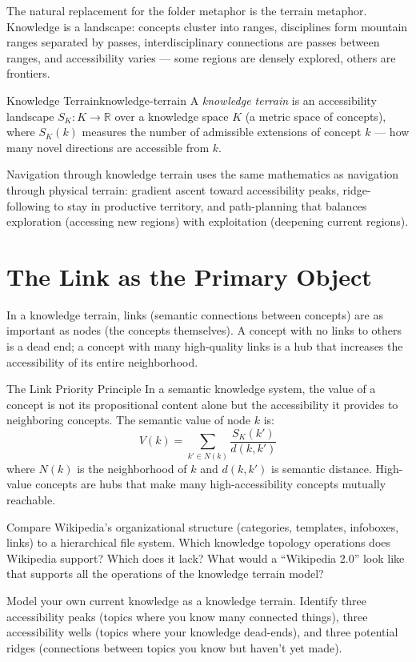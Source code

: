 The natural replacement for the folder metaphor is the terrain metaphor.
Knowledge is a landscape: concepts cluster into ranges, disciplines form
mountain ranges separated by passes, interdisciplinary connections are
passes between ranges, and accessibility varies — some regions are
densely explored, others are frontiers.

\begin{definition}{Knowledge Terrain}{knowledge-terrain}
  A \emph{knowledge terrain} is an accessibility landscape $S_K : K \to
  \mathbb{R}$ over a knowledge space $K$ (a metric space of concepts),
  where $S_K(k)$ measures the number of admissible extensions of concept
  $k$ — how many novel directions are accessible from $k$.
\end{definition}

Navigation through knowledge terrain uses the same mathematics as
navigation through physical terrain: gradient ascent toward accessibility
peaks, ridge-following to stay in productive territory, and path-planning
that balances exploration (accessing new regions) with exploitation
(deepening current regions).

\section{The Link as the Primary Object}

In a knowledge terrain, links (semantic connections between concepts)
are as important as nodes (the concepts themselves). A concept with no
links to others is a dead end; a concept with many high-quality links
is a hub that increases the accessibility of its entire neighborhood.

\begin{namedthm}{The Link Priority Principle}
  In a semantic knowledge system, the value of a concept is not its
  propositional content alone but the accessibility it provides to
  neighboring concepts. The semantic value of node $k$ is:
  \[
    V(k) = \sum_{k' \in N(k)} \frac{S_K(k')}{d(k, k')}
  \]
  where $N(k)$ is the neighborhood of $k$ and $d(k,k')$ is semantic
  distance. High-value concepts are hubs that make many high-accessibility
  concepts mutually reachable.
\end{namedthm}

\begin{exercise}
  Compare Wikipedia's organizational structure (categories, templates,
  infoboxes, links) to a hierarchical file system. Which knowledge
  topology operations does Wikipedia support? Which does it lack?
  What would a ``Wikipedia 2.0'' look like that supports all the
  operations of the knowledge terrain model?
\end{exercise}

\begin{exercise}
  Model your own current knowledge as a knowledge terrain.
  Identify three accessibility peaks (topics where you know many
  connected things), three accessibility wells (topics where
  your knowledge dead-ends), and three potential ridges
  (connections between topics you know but haven't yet made).
\end{exercise}
